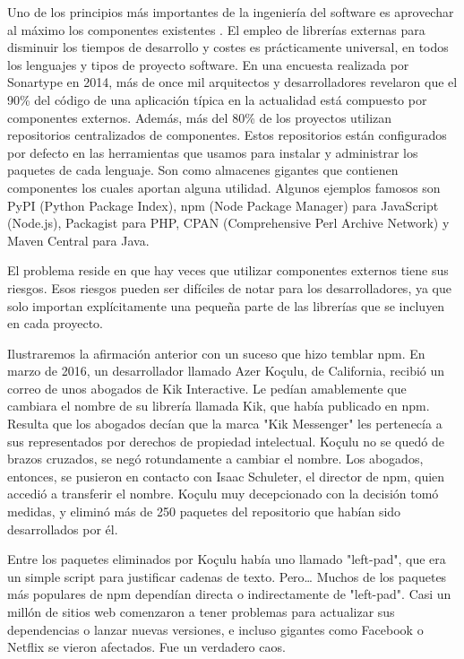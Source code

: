 

Uno de los principios más importantes de la ingeniería del software es aprovechar al máximo los componentes existentes \cite{sametinger1997software}.
El empleo de librerías externas para disminuir los tiempos de desarrollo y costes es prácticamente universal,
en todos los lenguajes y tipos de proyecto software. En una encuesta realizada por Sonartype en 2014, más de once mil arquitectos y
desarrolladores revelaron que el 90\% del código de una aplicación típica en la actualidad está compuesto por componentes externos.
Además, más del 80\% de los proyectos utilizan repositorios centralizados de componentes.
Estos repositorios están configurados por defecto en las herramientas que usamos para instalar y administrar los paquetes de cada lenguaje.
Son como almacenes gigantes que contienen componentes los cuales aportan alguna utilidad.
Algunos ejemplos famosos son PyPI (Python Package Index), npm (Node Package Manager) para JavaScript (Node.js),
Packagist para PHP, CPAN (Comprehensive Perl Archive Network) y Maven Central para Java.


El problema reside en que hay veces que utilizar componentes externos tiene sus riesgos. Esos riesgos pueden ser difíciles de notar para los desarrolladores, ya que solo importan explícitamente una pequeña parte de las librerías que se incluyen en cada proyecto.


Ilustraremos la afirmación anterior con un suceso que hizo temblar npm.
En marzo de 2016, un desarrollador llamado Azer Koçulu, de California, recibió un correo de unos abogados de Kik Interactive.
Le pedían amablemente que cambiara el nombre de su librería llamada Kik, que había publicado en npm.
Resulta que los abogados decían que la marca "Kik Messenger" les pertenecía a sus representados \cite{8998991} por derechos de propiedad intelectual.
Koçulu no se quedó de brazos cruzados, se negó rotundamente a cambiar el nombre.
Los abogados, entonces, se pusieron en contacto con Isaac Schuleter, el director de npm, quien accedió a transferir el nombre.
Koçulu muy decepcionado con la decisión tomó medidas, y eliminó más de 250 paquetes del repositorio que habían sido desarrollados por él.


Entre los paquetes eliminados por Koçulu había uno llamado "left-pad",
que era un simple script para justificar cadenas de texto. Pero… Muchos de los paquetes más populares de npm dependían directa
o indirectamente de "left-pad". Casi un millón de sitios web comenzaron a tener problemas para actualizar sus dependencias o
lanzar nuevas versiones, e incluso gigantes como Facebook o Netflix se vieron afectados. Fue un verdadero caos.

